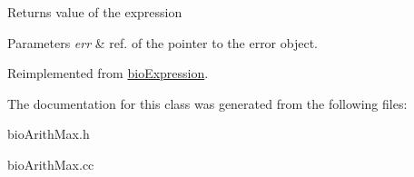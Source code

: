 \begin{DoxyReturn}{Returns}
value of the expression 
\end{DoxyReturn}

\begin{DoxyParams}{Parameters}
{\em err} & ref. of the pointer to the error object. \\
\hline
\end{DoxyParams}


Reimplemented from \hyperlink{classbio_expression_af58662a5d4d456f15bc4f2c9bd4f8a5b}{bio\+Expression}.



The documentation for this class was generated from the following files\+:\begin{DoxyCompactItemize}
\item 
bio\+Arith\+Max.\+h\item 
bio\+Arith\+Max.\+cc\end{DoxyCompactItemize}
